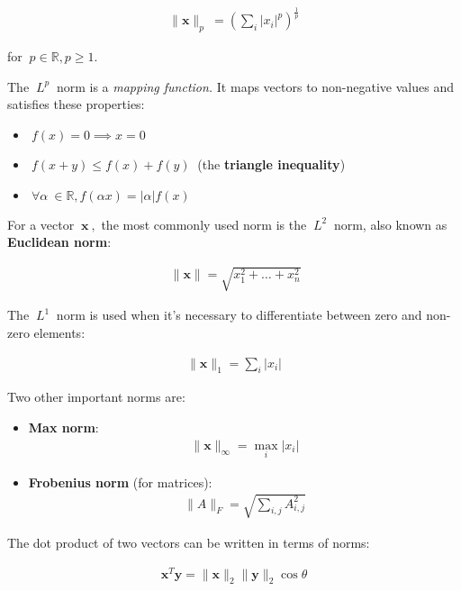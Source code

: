 \documentclass[12pt]{article}
\begin{document}
\begin{align}
\|\mathbf{x}\|_{p} \  = \left( \sum_i \left| x_i \right| ^p \right) ^ {\frac {1}{p}}
\end{align}

for $\ p \in \mathbb{R}, p \ge 1. \ $

The $\ L^{p}\ $ norm is a \textit{mapping function.} It maps vectors to non-negative values and satisfies these properties:

\begin{itemize}
    \item $\ f(x) = 0 \implies x = 0 \ $
    \item $\ f(x+y) \le f(x) + f(y)\ $ (the \textbf{triangle inequality})
    \item $\ \forall \alpha \ \in \mathbb{R}, f(\alpha x) = \left| \alpha \right|f(x) \ $
\end{itemize}

For a vector $\ \mathbf{x} \ ,$ the most commonly used norm is the $\ L^{2} \ $ norm, also known as \textbf{Euclidean norm}:

\begin{align}
\ \|\mathbf{x}\| = \sqrt{x_1^2 + \dots + x_n^2}
\end{align}

The $\ L^{1} \ $ norm is used when it's necessary to differentiate between zero and non-zero elements:

\begin{align}
\|\mathbf{x}\|_{1} = \sum_{i} \left|x_{i}\right|
\end{align}

Two other important norms are:

\begin{itemize}
    \item \textbf{Max norm}:
    \begin{align}
    \|\mathbf{x}\|_{\infty} = \max_{i} \left|x_{i}\right|
    \end{align}
    \item \textbf{Frobenius norm} (for matrices):
    \begin{align}
    \|A\|_{F} = \sqrt{\sum_{i,j}A^{2}_{i,j}}
    \end{align}
\end{itemize}

The dot product of two vectors can be written in terms of norms:

\begin{align}
\mathbf{x}^{T}\mathbf{y} = \|\mathbf{x}\|_{2}\|\mathbf{y}\|_{2}\cos\theta
\end{align}
\end{document}
